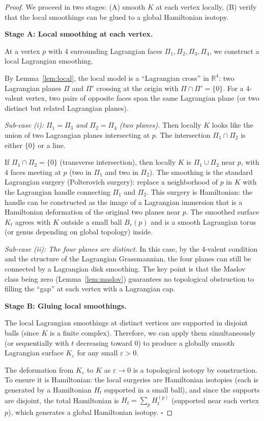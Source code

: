 \documentclass[12pt]{article}
\newcommand{\bR}{\mathbb{R}}
\begin{document}
\begin{proof}
We proceed in two stages: (A) smooth $K$ at each vertex locally, (B) verify that the local smoothings can be glued to a global Hamiltonian isotopy.

\medskip
\noindent\textbf{Stage A: Local smoothing at each vertex.}

At a vertex $p$ with 4 surrounding Lagrangian faces $\Pi_1,\Pi_2,\Pi_3,\Pi_4$, we construct a local Lagrangian smoothing.

By Lemma~\ref{lem:local}, the local model is a ``Lagrangian cross'' in $\bR^4$: two Lagrangian planes $\Pi$ and $\Pi'$ crossing at the origin with $\Pi\cap\Pi'=\{0\}$.  For a 4-valent vertex, two pairs of opposite faces span the same Lagrangian plane (or two distinct but related Lagrangian planes).

\textit{Sub-case (i): $\Pi_1 = \Pi_3$ and $\Pi_2 = \Pi_4$ (two planes).}  Then locally $K$ looks like the union of two Lagrangian planes intersecting at $p$.  The intersection $\Pi_1\cap\Pi_2$ is either $\{0\}$ or a line.

If $\Pi_1\cap\Pi_2 = \{0\}$ (transverse intersection), then locally $K$ is $\Pi_1\cup\Pi_2$ near $p$, with 4 faces meeting at $p$ (two in $\Pi_1$ and two in $\Pi_2$).  The smoothing is the standard Lagrangian surgery (Polterovich surgery): replace a neighborhood of $p$ in $K$ with the Lagrangian handle connecting $\Pi_1$ and $\Pi_2$.  This surgery is Hamiltonian: the handle can be constructed as the image of a Lagrangian immersion that is a Hamiltonian deformation of the original two planes near $p$.  The smoothed surface $K_t$ agrees with $K$ outside a small ball $B_r(p)$ and is a smooth Lagrangian torus (or genus depending on global topology) inside.

\textit{Sub-case (ii): The four planes are distinct.}  In this case, by the 4-valent condition and the structure of the Lagrangian Grassmannian, the four planes can still be connected by a Lagrangian disk smoothing.  The key point is that the Maslov class being zero (Lemma~\ref{lem:maslov}) guarantees no topological obstruction to filling the ``gap'' at each vertex with a Lagrangian cap.

\medskip
\noindent\textbf{Stage B: Gluing local smoothings.}

The local Lagrangian smoothings at distinct vertices are supported in disjoint balls (since $K$ is a finite complex).  Therefore, we can apply them simultaneously (or sequentially with $t$ decreasing toward 0) to produce a globally smooth Lagrangian surface $K_\varepsilon$ for any small $\varepsilon > 0$.

The deformation from $K_\varepsilon$ to $K$ as $\varepsilon\to 0$ is a topological isotopy by construction.  To ensure it is Hamiltonian: the local surgeries are Hamiltonian isotopies (each is generated by a Hamiltonian $H_t$ supported in a small ball), and since the supports are disjoint, the total Hamiltonian is $H_t = \sum_p H_t^{(p)}$ (supported near each vertex $p$), which generates a global Hamiltonian isotopy. \hfill$\square$
\end{proof}
\end{document}
